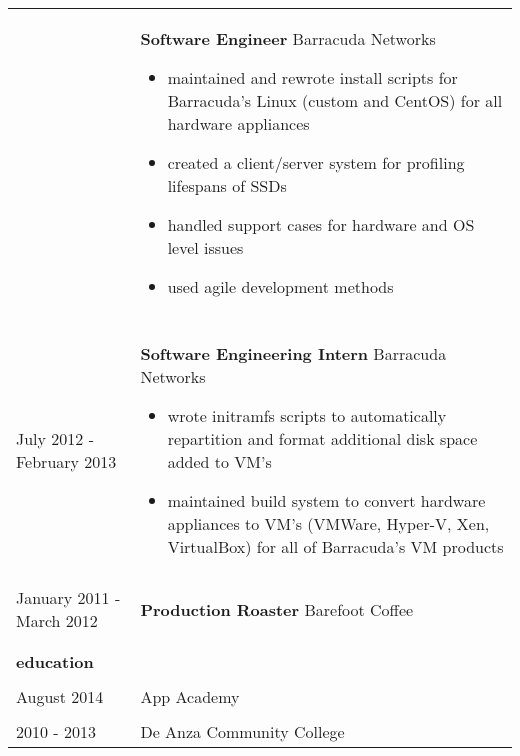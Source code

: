 \documentclass{article}
\begin{document}
\begin{tabular}{L{2.5cm} R{14cm}}
    &

    \textbf{Software Engineer}
    Barracuda Networks

    \begin{itemize}
        \item maintained and rewrote install scripts for Barracuda's Linux 
            (custom and CentOS) for all hardware appliances
        \item created a client/server system for profiling lifespans of
            SSDs
        \item handled support cases for hardware and OS level issues
        \item used agile development methods
    \end{itemize}

    \\\\
    
    July 2012 - February 2013
    &
    \textbf{Software Engineering Intern}
    Barracuda Networks

    \begin{itemize}
        \item wrote initramfs scripts to automatically repartition and 
            format additional disk space added to VM's
        \item maintained build system to convert hardware appliances to VM's
            (VMWare, Hyper-V, Xen, VirtualBox) for all of Barracuda's VM products
    \end{itemize}

    \\\\
    
    January 2011 - March 2012
    &
    \textbf{Production Roaster}
    Barefoot Coffee
    
    \\\\ \hline \\

    \large{\textbf{education}} \\\\
    \normalsize

    August 2014 & App Academy \\

    \\

    2010 - 2013 & De Anza Community College \\
\end{tabular}
\end{document}
